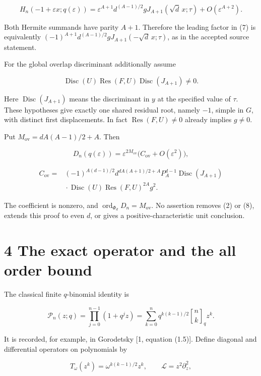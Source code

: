 \documentclass[
  11pt,
]{article}
\begin{document}
\[
H_n(-1+\varepsilon x;q(\varepsilon))
=\varepsilon^{A+1}d^{(A-1)/2}g
J_{A+1}(\sqrt d\,x;\tau)+O(\varepsilon^{A+2}). \tag{7}
\]

Both Hermite summands have parity \(A+1\). Therefore the leading factor
in (7) is equivalently
\((-1)^{A+1}d^{(A-1)/2}gJ_{A+1}(-\sqrt d\,x;\tau)\), as in the accepted
source statement.

For the global overlap discriminant additionally assume

\[
\operatorname{Disc}(U)\operatorname{Res}(F,U)
\operatorname{Disc}(J_{A+1})\ne 0. \tag{8}
\]

Here \(\operatorname{Disc}(J_{A+1})\) means the discriminant in \(y\) at
the specified value of \(\tau\). These hypotheses give exactly one
shared residual root, namely \(-1\), simple in \(G\), with distinct
first displacements. In fact \(\operatorname{Res}(F,U)\ne0\) already
implies \(g\ne0\).

Put \(M_{\mathrm{ov}}=dA(A-1)/2+A\). Then

\[
D_n(q(\varepsilon))=
\varepsilon^{2M_{\mathrm{ov}}}
\bigl(C_{\mathrm{ov}}+O(\varepsilon^2)\bigr), \tag{9}
\]

\[
\begin{aligned}
C_{\mathrm{ov}}={}&(-1)^{A(d-1)/2}
 d^{dA(A+1)/2+A}P_A^{d-1}\operatorname{Disc}(J_{A+1})\\
&\mathrel{}\cdot\operatorname{Disc}(U)
\operatorname{Res}(F,U)^{2A}g^2.
\end{aligned} \tag{10}
\]

The coefficient is nonzero, and
\(\operatorname{ord}_{\Phi_d}D_n=M_{\mathrm{ov}}\). No assertion removes
(2) or (8), extends this proof to even \(d\), or gives a
positive-characteristic unit conclusion.

\section{4 The exact operator and the all order
bound}\label{the-exact-operator-and-the-all-order-bound}

The classical finite \(q\)-binomial identity is

\[
\mathcal P_n(z;q)=\prod_{j=0}^{n-1}(1+q^jz)
=\sum_{k=0}^{n}q^{k(k-1)/2}\genfrac{[}{]}{0pt}{}{n}{k}_qz^k. \tag{11}
\]

It is recorded, for example, in Gorodetsky {[}1, equation (1.5){]}.
Define diagonal and differential operators on polynomials by

\[
T_\omega(z^k)=\omega^{k(k-1)/2}z^k,
\qquad \mathcal L=z^2\partial_z^2,
\]
\end{document}
